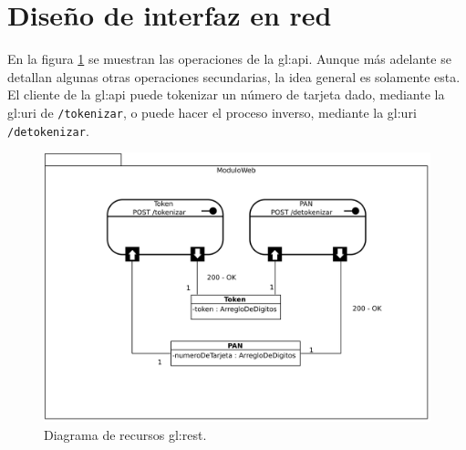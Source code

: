 %
%

\section{Diseño de interfaz en red}

En la figura \ref{diagrama_api} se muestran las operaciones de la \gls{gl:api}.
Aunque más adelante se detallan algunas otras operaciones secundarias, la idea
general es solamente esta. El cliente de la \gls{gl:api} puede tokenizar un
número de tarjeta dado, mediante la \gls{gl:uri} de \texttt{/tokenizar}, o puede
hacer el proceso inverso, mediante la \gls{gl:uri} \texttt{/detokenizar}.

\begin{figure}
  \begin{center}
    \includegraphics[width=0.8\linewidth]{diagramas/api_rest.png}
    \caption{Diagrama de recursos \gls{gl:rest}.}
    \label{diagrama_api}
  \end{center}
\end{figure}
